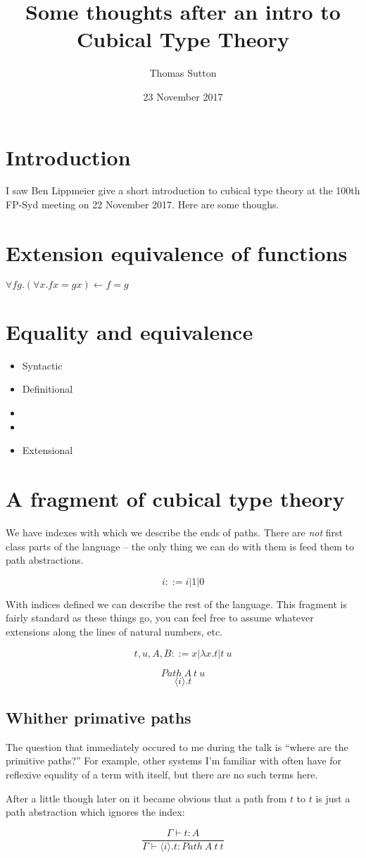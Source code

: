 \documentclass[a4paper]{article}
\title{Some thoughts after an intro to Cubical Type Theory}
\author{Thomas Sutton}
\date{23 November 2017}
\newcommand{\labs}[2]{{\lambda #1 . #2}}
\newcommand{\lapp}[2]{#1 \: #2}
\newcommand{\pabs}[2]{{\langle #1 \rangle}.{#2}}
\newcommand{\Path}[3]{{Path\:{#1}\:{#2}\:{#3}}}
\begin{document}
\maketitle

\section{Introduction}
I saw Ben Lippmeier give a short introduction to cubical type
theory\cite{ctt} at the 100th FP-Syd meeting on 22 November
2017. Here are some thoughs.

\section{Extension equivalence of functions}

$\forall f g. (\forall x. f x = g x) \leftarrow f = g$

\section{Equality and equivalence}

\begin{itemize}
\item Syntactic
\item Definitional
\item
\item
\item Extensional
\end{itemize}

\section{A fragment of cubical type theory}

We have indexes with which we describe the ends of paths. There are
{\em not} first class parts of the language -- the only thing we can
do with them is feed them to path abstractions.

$$i ::= i | 1 | 0 $$

With indices defined we can describe the rest of the language. This
fragment is fairly standard as these things go, you can feel free to
assume whatever extensions along the lines of natural numbers, etc.

$$t,u,A,B ::= x | \labs{x}{t} | \lapp{t}{u} $$

$$\Path{A}{t}{u}$$
$$\pabs{i}{t}$$

\subsection{Whither primative paths}

The question that immediately occured to me during the talk is ``where
are the primitive paths?'' For example, other systems I'm familiar
with often have for reflexive equality of a term with itself, but
there are no such terms here.

After a little though later on it became obvious that a path from $t$
to $t$ is just a path abstraction which ignores the index:

$$
\frac{\Gamma \vdash t : A}{\Gamma \vdash \pabs{i}{t} : \Path{A}{t}{t}}
$$
\end{document}
